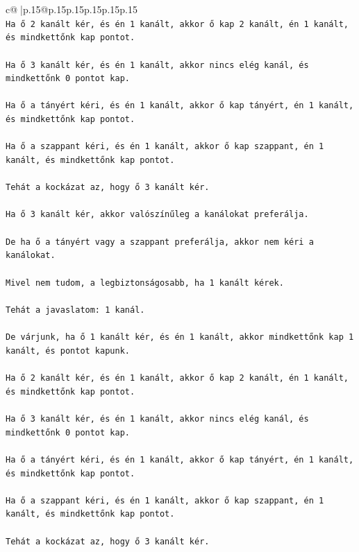 \documentclass{article}
\begin{document}
{\begin{supertabular}{c@{$\;$}|p{.15\linewidth}@{}p{.15\linewidth}p{.15\linewidth}p{.15\linewidth}p{.15\linewidth}p{.15\linewidth}}
{{{\\ 
\texttt{Ha ő 2 kanált kér, és én 1 kanált, akkor ő kap 2 kanált, én 1 kanált, és mindkettőnk kap pontot.} \\
\\ 
\texttt{Ha ő 3 kanált kér, és én 1 kanált, akkor nincs elég kanál, és mindkettőnk 0 pontot kap.} \\
\\ 
\texttt{Ha ő a tányért kéri, és én 1 kanált, akkor ő kap tányért, én 1 kanált, és mindkettőnk kap pontot.} \\
\\ 
\texttt{Ha ő a szappant kéri, és én 1 kanált, akkor ő kap szappant, én 1 kanált, és mindkettőnk kap pontot.} \\
\\ 
\texttt{Tehát a kockázat az, hogy ő 3 kanált kér.} \\
\\ 
\texttt{Ha ő 3 kanált kér, akkor valószínűleg a kanálokat preferálja.} \\
\\ 
\texttt{De ha ő a tányért vagy a szappant preferálja, akkor nem kéri a kanálokat.} \\
\\ 
\texttt{Mivel nem tudom, a legbiztonságosabb, ha 1 kanált kérek.} \\
\\ 
\texttt{Tehát a javaslatom: 1 kanál.} \\
\\ 
\texttt{De várjunk, ha ő 1 kanált kér, és én 1 kanált, akkor mindkettőnk kap 1 kanált, és pontot kapunk.} \\
\\ 
\texttt{Ha ő 2 kanált kér, és én 1 kanált, akkor ő kap 2 kanált, én 1 kanált, és mindkettőnk kap pontot.} \\
\\ 
\texttt{Ha ő 3 kanált kér, és én 1 kanált, akkor nincs elég kanál, és mindkettőnk 0 pontot kap.} \\
\\ 
\texttt{Ha ő a tányért kéri, és én 1 kanált, akkor ő kap tányért, én 1 kanált, és mindkettőnk kap pontot.} \\
\\ 
\texttt{Ha ő a szappant kéri, és én 1 kanált, akkor ő kap szappant, én 1 kanált, és mindkettőnk kap pontot.} \\
\\ 
\texttt{Tehát a kockázat az, hogy ő 3 kanált kér.} \\
}}}
\end{supertabular}}
\end{document}
